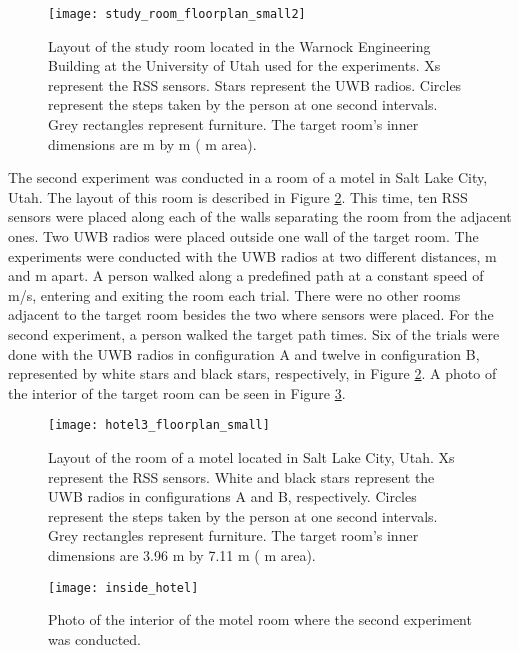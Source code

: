 \documentclass[conference]{IEEEtran}
\begin{document}
\begin{figure}[t!]
    \centerline{\texttt{[image: study\_room\_floorplan\_small2]}}
    \caption{Layout of the study room located in the Warnock
      Engineering Building at the University of Utah used for the
      experiments. Xs represent the  RSS sensors. Stars represent
      the  UWB radios. Circles represent the steps taken by the
      person at one second intervals. Grey rectangles represent
      furniture. The target room's inner dimensions are  m by
       m ( m area).}
    \label{fig:study_room_layout}
\end{figure}

The second experiment was conducted in a room of a motel in Salt Lake
City, Utah. The layout of this room is described in Figure
\ref{fig:hotel_layout}. This time, ten RSS sensors were placed along
each of the walls separating the room from the adjacent ones. Two UWB
radios were placed outside one wall of the target room. The
experiments were conducted with the UWB radios at two different
distances,  m and  m apart. A person walked along a
predefined path at a constant speed of  m/s, entering and exiting
the room each trial. There were no other rooms adjacent to the target
room besides the two where sensors were placed.  For the second
experiment, a person walked the target path  times. Six of the
trials were done with the UWB radios in configuration A and twelve in
configuration B, represented by white stars and black stars,
respectively, in Figure \ref{fig:hotel_layout}. A photo of the
interior of the target room can be seen in Figure
\ref{fig:inside_hotel}.

\begin{figure}[t!]
    \centerline{\texttt{[image: hotel3\_floorplan\_small]}}
    \caption{Layout of the room of a motel located in Salt Lake City,
      Utah. Xs represent the RSS sensors. White and black stars
      represent the UWB radios in configurations A and B,
      respectively. Circles represent the steps taken by the person at
      one second intervals. Grey rectangles represent furniture. The
      target room's inner dimensions are 3.96 m by 7.11 m (
      m area).}
    \label{fig:hotel_layout}
\end{figure}

\begin{figure}[t!]
    \centerline{\texttt{[image: inside\_hotel]}}
    \caption{Photo of the interior of the motel room where the second
      experiment was conducted.}
    \label{fig:inside_hotel}
\end{figure}
\end{document}
